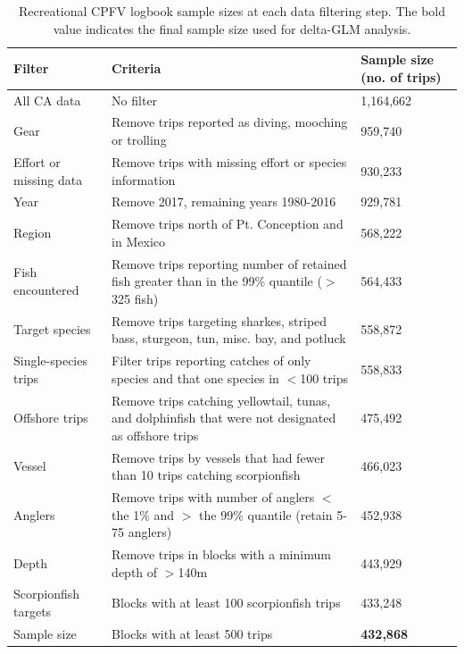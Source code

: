 \documentclass[12pt,]{article}
\begin{document}
\FloatBarrier

\begin{table}[ht]
\centering
\caption{Recreational CPFV logbook sample 
                                          sizes at each data filtering step.  
                                          The bold value indicates the final sample size 
                                          used for delta-GLM analysis.} 
\label{tab:Fleet5_RecPC_CPFVlogbook_filter}
\begin{tabular}{>{\raggedright}p{1.5in}>{\raggedright}p{3in}>{\raggedright}p{1in}}
  \hline
Filter & Criteria & Sample size (no. of trips) \\ 
  \hline
All CA data & No filter & 1,164,662 \\ 
  Gear & Remove trips reported as diving, mooching or trolling & 959,740 \\ 
  Effort or missing data & Remove trips with missing effort or species information & 930,233 \\ 
  Year & Remove 2017, remaining years 1980-2016 & 929,781 \\ 
  Region & Remove trips north of Pt. Conception and in Mexico & 568,222 \\ 
  Fish encountered & Remove trips reporting number of retained fish greater than in the 99\% quantile ($>$325 fish) & 564,433 \\ 
  Target species & Remove trips targeting sharkes, striped bass, sturgeon, tun, misc. bay, and potluck & 558,872 \\ 
  Single-species trips & Filter trips reporting catches of only species and that one species in $<$100 trips & 558,833 \\ 
  Offshore trips & Remove trips catching yellowtail, tunas, and dolphinfish that were not designated as offshore trips & 475,492 \\ 
  Vessel & Remove trips by vessels that had fewer than 10 trips catching scorpionfish & 466,023 \\ 
  Anglers & Remove trips with number of anglers $<$ the 1\% and $>$ the 99\% quantile (retain 5-75 anglers) & 452,938 \\ 
  Depth & Remove trips in blocks with a minimum depth of $>$140m & 443,929 \\ 
  Scorpionfish targets & Blocks with at least 100 scorpionfish trips & 433,248 \\ 
  Sample size & Blocks with at least 500 trips & \textbf{432,868} \\ 
   \hline
\end{tabular}

\end{table}
\end{document}
